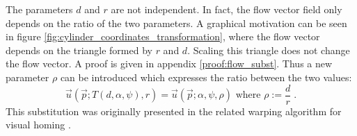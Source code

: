The parameters $d$ and $r$ are not independent. In fact, the flow vector field only depends on the ratio of the two parameters. A graphical motivation can be seen in figure \ref{fig:cylinder_coordinates_transformation}, where the flow vector depends on the triangle formed by $r$ and $d$. Scaling this triangle does not change the flow vector. A proof is given in appendix \ref{proof:flow_subst}. Thus a new parameter $\rho$ can be introduced which expresses the ratio between the two values:
\begin{equation}
 \vec u(\vec p; T(d, \alpha, \psi), r) = \vec u(\vec p; \alpha, \psi, \rho) \text{ where } \rho := \frac{d}{r} \; .
\end{equation}
This substitution was originally presented in the related warping algorithm for visual homing \citep{franz1998did}.

